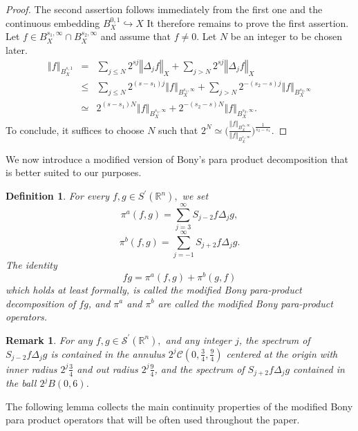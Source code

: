\documentclass[11pt]{amsart}%
\theoremstyle{plain}
\numberwithin{equation}{section}
\newtheorem{definition}{Definition}[section]
\newtheorem{remark}{Remark}[section]
\begin{document}
\begin{proof}
The second assertion follows immediately from the first one and the continuous embedding
$B_X^{0,1}\hookrightarrow X$ It therefore remains to prove the first assertion. Let $f\in B_{X}^{s_1,\infty}\cap B_{X}^{s_2,\infty}$ and assume that $f\neq0$. Let $N$ be an integer to be chosen later.
\begin{eqnarray*}
     \left\Vert f\right\Vert _{B_{X}^{s,1}}&=&\sum_{j\leq N}2^{sj}\left\Vert \Delta_jf\right\Vert_X+\sum_{j> N}2^{sj}\left\Vert \Delta_jf\right\Vert_X\\
    &\leq&\sum_{j\leq N}2^{(s-s_1)j} \left\Vert f\right\Vert_{B_{X}^{s_1,\infty}}+\sum_{j> N}2^{-(s_2-s)j}\left\Vert f\right\Vert_{B_{X}^{s_2,\infty}}\\
    &\simeq& 2^{(s-s_1)N}\left\Vert f\right\Vert_{B_{X}^{s_1,\infty}}+2^{-(s_2-s)N}\left\Vert f\right\Vert_{B_{X}^{s_2,\infty}}.
\end{eqnarray*}
To conclude, it suffices to choose $N$ such that $2^N\simeq\big(\frac{\left\Vert f\right\Vert_{B_{X}^{s_2,\infty}}}{\left\Vert f\right\Vert_{B_{X}^{s_1,\infty}}}\big)^{\frac{1}{s_2-s_1}}$.
\end{proof}
We now introduce a modified version of Bony's para product decomposition that is better suited to our purposes.
\begin{definition}
For every $f,g\in S^{\prime }(\mathbb{R}^{n}),$ we set
$$\pi^a(f,g)=\sum_{j=3}^\infty S_{j-2}f\Delta_j g,$$
$$\pi^b(f,g)=\sum_{j=-1}^\infty S_{j+2}f\Delta_j g.$$
The identity
$$fg=\pi^a(f,g)+\pi^b(g,f)$$
which holds at least formally, is called the modified Bony para-product decomposition of $fg$, and $\pi^a$ and $\pi^b$ are called the modified Bony para-product operators.
\end{definition}
\begin{remark}\label{spectrum}
 For any $f,g\in \mathcal{S}^{\prime }(\mathbb{R}^{n}),$ and any integer $j$, the spectrum of $S_{j-2}f\Delta_j g$ is contained in the annulus $2^j \mathcal{C}(0,\frac{3}{4},\frac{9}{4})$ centered at the origin with inner radius $2^j \frac{3}{4}$ and out radius $2^j \frac{9}{4}$,  and the spectrum of $S_{j+2}f\Delta_j g$ contained in the ball $2^j B(0,6)$.
\end{remark}
The following lemma collects the main continuity properties of the modified Bony para product operators that will be often used throughout the paper.
\end{document}
